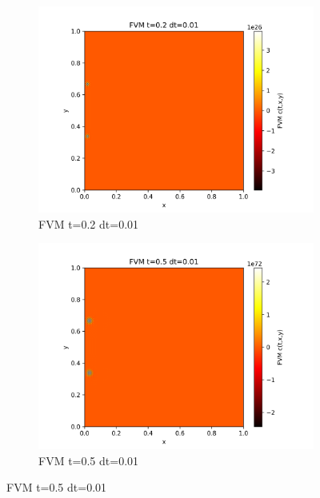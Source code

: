 \documentclass[11pt,a4 paper,one side]{article}
\begin{document}
\begin{figure}[htbp]
    \centering
    \begin{subfigure}{0.45\textwidth}
        \includegraphics[width=\textwidth]{FVM t=0.2 dt=0.01.png}
        \caption{FVM t=0.2 dt=0.01}
        \label{FVM t=0.2 dt=0.01}
    \end{subfigure}
    \hfill
    \begin{subfigure}{0.45\textwidth}
        \includegraphics[width=\textwidth]{FVM t=0.5 dt=0.01.png}
        \caption{FVM t=0.5 dt=0.01}
        \label{FVM t=0.5 dt=0.01}
    \end{subfigure}
    
    \vspace{0.5cm}  %
    

\end{figure}
\end{document}
